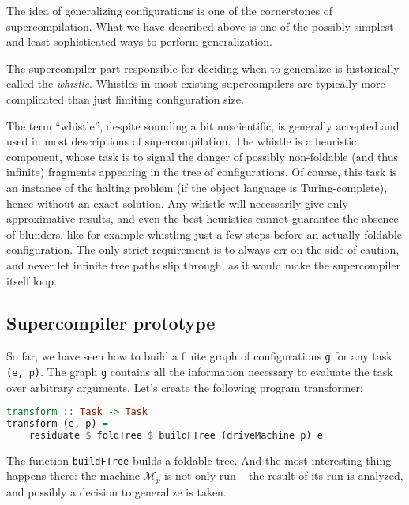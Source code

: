 The idea of generalizing configurations is one of the cornerstones of supercompilation.
What we have described above is one of the possibly simplest and 
least sophisticated ways to perform generalization.

The supercompiler part responsible for deciding when to generalize is
historically called the \emph{whistle}.
Whistles in most existing supercompilers are typically more complicated
than just limiting configuration size.

The term ``whistle'', despite sounding a bit unscientific, is generally accepted
and used in most descriptions of supercompilation.
The whistle is a heuristic component, whose task is to signal the danger of
possibly non-foldable (and thus infinite) fragments appearing in the tree of configurations.
Of course, this task is an instance of the halting problem
(if the object language is Turing-complete), hence without an exact solution.
Any whistle will necessarily give only approximative results, and even the
best heuristics cannot guarantee the absence of blunders, like for example
whistling just a few steps before an actually foldable configuration.
The only strict requirement is to always err on the side of caution,
and never let infinite tree paths slip through, as it would make
the supercompiler itself loop.

\subsection{Supercompiler prototype}

So far, we have seen how to build a finite graph of configurations  \texttt{g} for any task \texttt{(e, p)}.
The graph \texttt{g} contains all the information necessary to evaluate the task over arbitrary arguments.
%
Let's create the following program transformer:
\begin{lstlisting}[language=haskell]
transform :: Task -> Task
transform (e, p) =
	residuate $ foldTree $ buildFTree (driveMachine p) e
\end{lstlisting}

The function \texttt{buildFTree} builds a foldable tree. 
And the most interesting thing happens there:
the machine $\mathcal{M}_p$ is not only run -- the result of its run
is analyzed, and possibly a decision to generalize is taken.

